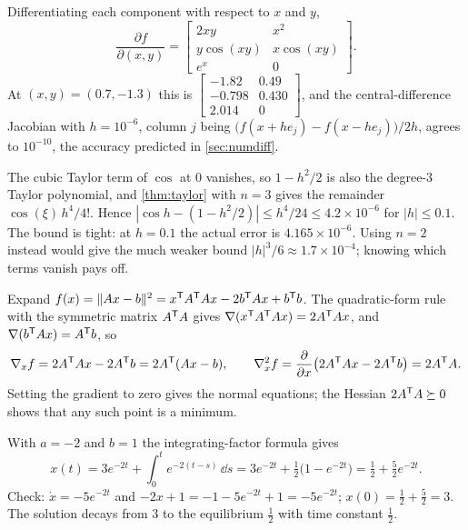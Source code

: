 \begin{solutions}
  \item Differentiating each component with respect to $x$ and $y$,
        \[
          \frac{\partial f}{\partial(x, y)} = \begin{bmatrix} 2xy & x^2 \\ y\cos(xy) & x\cos(xy) \\ e^x & 0 \end{bmatrix}.
        \]
        At $(x, y) = (0.7, -1.3)$ this is $\begin{bmatrix}-1.82 & 0.49\\ -0.798 & 0.430\\ 2.014 & 0\end{bmatrix}$, and the central-difference Jacobian
        with $h = 10^{-6}$, column $j$ being $\big(f(x + he_j) - f(x - he_j)\big)/2h$, agrees to $10^{-10}$, the accuracy predicted in
        \cref{sec:numdiff}.

  \item The cubic Taylor term of $\cos$ at $0$ vanishes, so $1 - h^2/2$ is also the degree-3 Taylor polynomial, and \cref{thm:taylor} with $n = 3$
        gives the remainder $\cos(\xi)\,h^4/4!$. Hence $|\cos h - (1 - h^2/2)| \le h^4/24 \le 4.2\times10^{-6}$ for $|h| \le 0.1$. The bound is tight:
        at $h = 0.1$ the actual error is $4.165\times10^{-6}$. Using $n = 2$ instead would give the much weaker bound $|h|^3/6 \approx 1.7\times10^{-4}$;
        knowing which terms vanish pays off.

  \item Expand $f(x) = \|Ax - b\|^2 = x^{\mathsf{T}} A^{\mathsf{T}} Ax - 2b^{\mathsf{T}} Ax + b^{\mathsf{T}} b$. The quadratic-form rule with the symmetric matrix $A^{\mathsf{T}} A$ gives
        $\nabla(x^{\mathsf{T}} A^{\mathsf{T}} Ax) = 2A^{\mathsf{T}} Ax$, and $\nabla(b^{\mathsf{T}} Ax) = A^{\mathsf{T}} b$, so
        \[
          \nabla_xf = 2A^{\mathsf{T}} Ax - 2A^{\mathsf{T}} b = 2A^{\mathsf{T}}(Ax - b), \qquad \nabla^2_xf = \frac{\partial}{\partial x}\big(2A^{\mathsf{T}} Ax - 2A^{\mathsf{T}} b\big) = 2A^{\mathsf{T}} A .
        \]
        Setting the gradient to zero gives the normal equations; the Hessian $2A^{\mathsf{T}} A \succeq 0$ shows that any such point is a minimum.

  \item With $a = -2$ and $b = 1$ the integrating-factor formula gives
        \[
          x(t) = 3e^{-2t} + \int_0^te^{-2(t-s)}\,\dd s = 3e^{-2t} + \tfrac12\big(1 - e^{-2t}\big) = \tfrac12 + \tfrac52e^{-2t}.
        \]
        Check: $\dot x = -5e^{-2t}$ and $-2x + 1 = -1 - 5e^{-2t} + 1 = -5e^{-2t}$; $x(0) = \tfrac12 + \tfrac52 = 3$. The solution decays from 3 to the
        equilibrium $\tfrac12$ with time constant $\tfrac12$.


\end{solutions}
